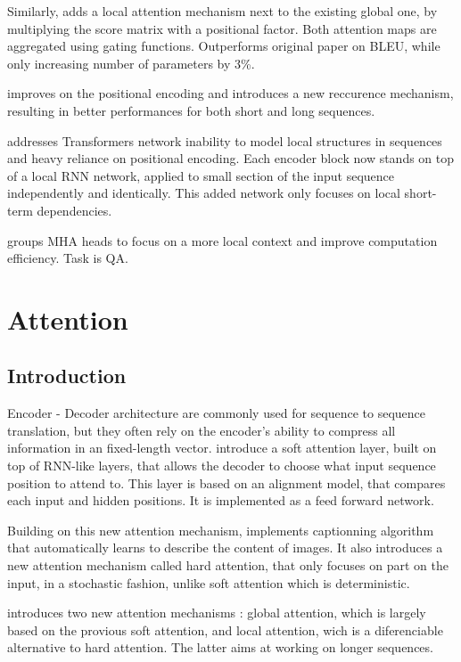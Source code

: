 \documentclass{article}
\begin{document}
    Similarly, \cite{Xu2019LeveragingLA} adds a local attention mechanism next to the existing global one, by multiplying the score matrix with a positional factor. Both attention maps are aggregated using gating functions. Outperforms original paper on BLEU, while only increasing number of parameters by 3\%.

    \cite[Transformer-XL]{Dai2019TransformerXLAL} improves on the positional encoding and introduces a new reccurence mechanism, resulting in better performances for both short and long sequences.

    \cite[R-Transformer]{Wang2019RTransformerRN} addresses Transformers network inability to model local structures in sequences and heavy reliance on positional encoding. Each encoder block now stands on top of a local RNN network, applied to small section of the input sequence independently and identically. This added network only focuses on local short-term dependencies.

    \cite{Xu2019GatedGS} groups MHA heads to focus on a more local context and improve computation efficiency. Task is QA.
    
\section{Attention}

    \subsection{Introduction}

    Encoder - Decoder architecture are commonly used for sequence to sequence translation, but they often rely on the encoder's ability to compress all information in an fixed-length vector. \cite{Bahdanau2014NeuralMT} introduce a soft attention layer, built on top of RNN-like layers, that allows the decoder to choose what input sequence position to attend to. This layer is based on an alignment model, that compares each input and hidden positions. It is implemented as a feed forward network.

    Building on this new attention mechanism, \cite{Xu2015ShowAA} implements captionning algorithm that automatically learns to describe the content of images. It also introduces a new attention mechanism called hard attention, that only focuses on part on the input, in a stochastic fashion, unlike soft attention which is deterministic.

    \cite{Luong2015EffectiveAT} introduces two new attention mechanisms : global attention, which is largely based on the provious soft attention, and local attention, wich is a diferenciable alternative to hard attention. The latter aims at working on longer sequences.
\end{document}
